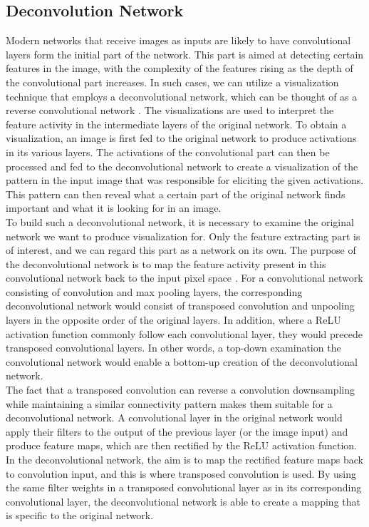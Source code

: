 \subsection{Deconvolution Network}

Modern networks that receive images as inputs are likely to have convolutional layers form the initial part of the network. This part is aimed at detecting certain features in the image, with the complexity of the features rising as the depth of the convolutional part increases. In such cases, we can utilize a visualization technique that employs a deconvolutional network, which can be thought of as a reverse convolutional network \cite{deconv_net}. The visualizations are used to interpret the feature activity in the intermediate layers of the original network. To obtain a visualization, an image is first fed to the original network to produce activations in its various layers. The activations of the convolutional part can then be processed and fed to the deconvolutional network to create a visualization of the pattern in the input image that was responsible for eliciting the given activations. This pattern can then reveal what a certain part of the original network finds important and what it is looking for in an image. \\

\noindent To build such a deconvolutional network, it is necessary to examine the original network we want to produce visualization for. Only the feature extracting part is of interest, and we can regard this part as a network on its own. The purpose of the deconvolutional network is to map the feature activity present in this convolutional network back to the input pixel space \cite{deconv_vis}. For a convolutional network consisting of convolution and max pooling layers, the corresponding deconvolutional network would consist of transposed convolution and unpooling layers in the opposite order of the original layers. In addition, where a ReLU activation function commonly follow each convolutional layer, they would precede transposed convolutional layers. In other words, a top-down examination the convolutional network would enable a bottom-up creation of the deconvolutional network. \\

\noindent The fact that a transposed convolution can reverse a convolution downsampling while maintaining a similar connectivity pattern makes them suitable for a deconvolutional network. A convolutional layer in the original network would apply their filters to the output of the previous layer (or the image input) and produce feature maps, which are then rectified by the ReLU activation function. In the deconvolutional network, the aim is to map the rectified feature maps back to convolution input, and this is where transposed convolution is used. By using the same filter weights in a transposed convolutional layer as in its corresponding convolutional layer, the deconvolutional network is able to create a mapping that is specific to the original network. \\

